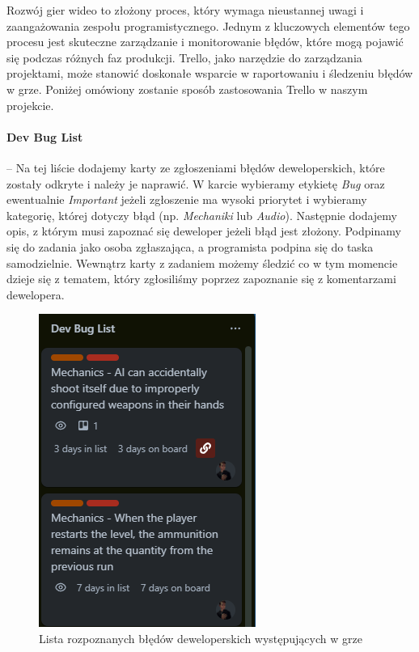 Rozwój gier wideo to złożony proces, który wymaga nieustannej uwagi i zaangażowania zespołu programistycznego. Jednym z kluczowych elementów tego procesu jest skuteczne zarządzanie i monitorowanie błędów, które mogą pojawić się podczas różnych faz produkcji. Trello, jako narzędzie do zarządzania projektami, może stanowić doskonałe wsparcie w raportowaniu i śledzeniu błędów w grze. Poniżej omówiony zostanie sposób zastosowania Trello w naszym projekcie.

\paragraph{Dev Bug List}\hspace{-1em} -- Na tej liście dodajemy karty ze zgłoszeniami błędów deweloperskich, które zostały odkryte i należy je naprawić. W karcie wybieramy etykietę \textit{Bug} oraz ewentualnie \textit{Important} jeżeli zgłoszenie ma wysoki priorytet i wybieramy kategorię, której dotyczy błąd (np.  \textit{Mechaniki} lub  \textit{Audio}). Następnie dodajemy opis, z którym musi zapoznać się deweloper jeżeli błąd jest złożony. Podpinamy się do zadania jako osoba zgłaszająca, a programista podpina się do taska samodzielnie. Wewnątrz karty z zadaniem możemy śledzić co w tym momencie dzieje się z tematem, który zgłosiliśmy poprzez zapoznanie się z komentarzami dewelopera.
\begin{figure}[h]
    \centering
    \includegraphics[scale=0.7]{Images/devBuglist.png}
    \caption{Lista rozpoznanych błędów deweloperskich występujących w grze}
    \label{fig:devBuglist}
\end{figure}
